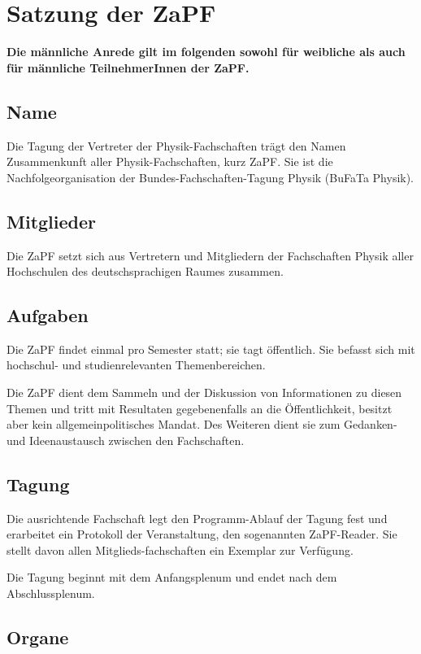 \documentclass[draft,12pt,oneside]{scrreprt}
\begin{document}
\chapter*{Satzung der ZaPF}

\textbf{Die männliche Anrede gilt im folgenden sowohl für weibliche
als auch für männliche TeilnehmerInnen der ZaPF.}

\section{Name}
Die Tagung der Vertreter der Physik-Fachschaften trägt den Namen Zusammenkunft
aller Physik-Fachschaften, kurz ZaPF.  Sie ist die Nachfolgeorganisation der
Bundes-Fachschaften-Tagung Physik (BuFaTa Physik).

\section{Mitglieder}
Die ZaPF setzt sich aus Vertretern und Mitgliedern der Fachschaften Physik
aller Hochschulen des deutschsprachigen Raumes zusammen.

\section{Aufgaben}
Die ZaPF findet einmal pro Semester statt; sie tagt öffentlich. Sie befasst
sich mit hochschul- und studienrelevanten Themenbereichen.

Die ZaPF dient dem Sammeln und der Diskussion von Informationen zu diesen Themen
und tritt mit Resultaten gegebenenfalls an die Öffentlichkeit, besitzt aber kein
allgemeinpolitisches Mandat.
Des Weiteren dient sie zum Gedanken- und Ideenaustausch zwischen den Fachschaften.

\section{Tagung}
Die ausrichtende Fachschaft legt den Programm-Ablauf der Tagung fest und
erarbeitet ein Protokoll der Veranstaltung, den sogenannten ZaPF-Reader. Sie
stellt davon allen Mitglieds-fachschaften ein Exemplar zur Verfügung.

Die Tagung beginnt mit dem Anfangsplenum und endet nach dem Abschlussplenum.

\section{Organe}
\end{document}
